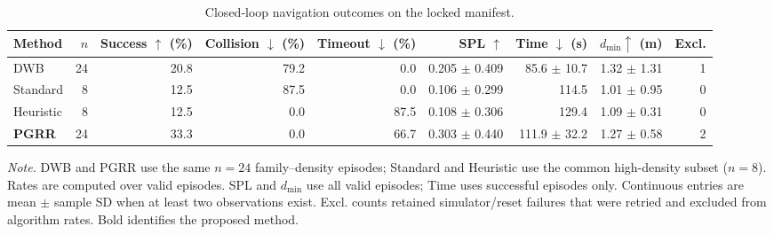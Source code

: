 \begin{table}[t]
\caption{Closed-loop navigation outcomes on the locked manifest.}
\label{tab:main-results}
\centering
\footnotesize
\setlength{\tabcolsep}{4.0pt}
\renewcommand{\arraystretch}{1.08}
\begin{tabular}{@{}lrrrrrrrr@{}}
\toprule
Method & $n$ & Success $\uparrow$ (\%) & Collision $\downarrow$ (\%)
& Timeout $\downarrow$ (\%) & SPL $\uparrow$ & Time $\downarrow$ (s)
& $d_{\min}\uparrow$ (m) & Excl. \\
\midrule
DWB & 24 & 20.8 & 79.2 & 0.0 & 0.205 $\pm$ 0.409 & 85.6 $\pm$ 10.7 & 1.32 $\pm$ 1.31 & 1 \\
Standard & 8 & 12.5 & 87.5 & 0.0 & 0.106 $\pm$ 0.299 & 114.5 & 1.01 $\pm$ 0.95 & 0 \\
Heuristic & 8 & 12.5 & 0.0 & 87.5 & 0.108 $\pm$ 0.306 & 129.4 & 1.09 $\pm$ 0.31 & 0 \\
\addlinespace[2pt]
\textbf{PGRR} & 24 & 33.3 & 0.0 & 66.7 & 0.303 $\pm$ 0.440 & 111.9 $\pm$ 32.2 & 1.27 $\pm$ 0.58 & 2 \\
\bottomrule
\end{tabular}
\vspace{2pt}

\parbox{0.98\textwidth}{\footnotesize \emph{Note.} DWB and PGRR use the same
$n=24$ family--density episodes; Standard and Heuristic use the common high-density subset
($n=8$). Rates are computed over valid episodes. SPL and $d_{\min}$ use all valid episodes;
Time uses successful episodes only. Continuous entries are mean $\pm$ sample SD when at least
two observations exist. Excl. counts retained simulator/reset failures that were retried and
excluded from algorithm rates. Bold identifies the proposed method.}
\end{table}
